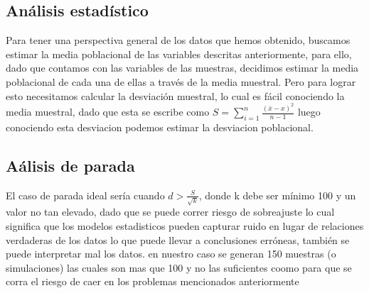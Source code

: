 \documentclass{article}
\begin{document}
\subsection{Análisis estadístico}
Para tener una perspectiva general de los datos que hemos obtenido, buscamos estimar la media poblacional de las variables descritas anteriormente, para ello, dado que contamos con las variables de las muestras, decidimos estimar la media poblacional de cada una de ellas a través de la media muestral. Pero para lograr esto necesitamos calcular la desviación muestral, lo cual es fácil conociendo la media muestral, dado que esta se escribe como $S=\sum\limits_{i=1}^{n}\frac{(\bar{x}-x)^2}{n-1}$ luego conociendo esta desviacion podemos estimar la desviacion poblacional. 
\subsection{Aálisis de parada}
El caso de parada ideal sería cuando $d>\frac{S}{\sqrt{k}}$, donde k debe ser mínimo 100 y un valor no tan elevado, dado que se puede correr riesgo de sobreajuste lo cual significa que los modelos estadisticos pueden capturar ruido en lugar de relaciones verdaderas de los datos lo que puede llevar a conclusiones erróneas, también se puede interpretar mal los datos. en nuestro caso se generan 150 muestras (o simulaciones) las cuales son mas que 100 y no las suficientes coomo para que se corra el riesgo de caer en los problemas mencionados anteriormente
\end{document}
